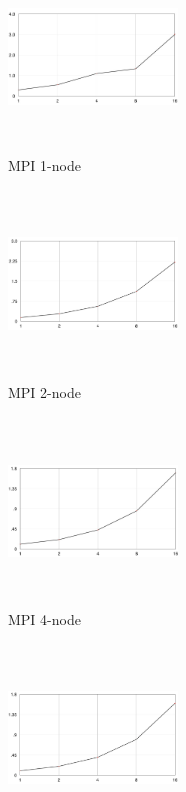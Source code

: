 \documentclass[11pt]{article}
\begin{document}
\begin{figure}[ht]
    \centering
        \begin{subfigure}[h!]{0.3\textwidth}
        \centering
        \includegraphics[width=4.5cm,height=5cm,keepaspectratio]{m1}
        \caption{MPI 1-node}
    \end{subfigure}
    \hfill
    \begin{subfigure}[h!]{0.3\textwidth}
        \centering
        \includegraphics[width=4.5cm,height=5cm,keepaspectratio]{m2}
        \caption{MPI 2-node}
    \end{subfigure}
    \hfill
    \begin{subfigure}[h!]{0.3\textwidth}
        \centering
        \includegraphics[width=4.5cm,height=5cm,keepaspectratio]{m4}
        \caption{MPI 4-node}
    \end{subfigure}
    \hfill
    \begin{subfigure}[h!]{0.3\textwidth}
        \centering
        \includegraphics[width=4.5cm,height=5cm,keepaspectratio]{m8}

\end{subfigure}
\end{figure}
\end{document}
